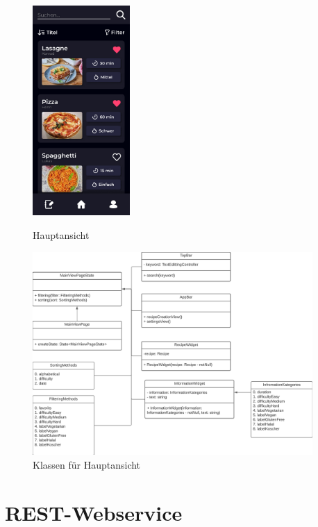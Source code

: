 \documentclass[parskip=full]{scrartcl}
\begin{document}
\begin{figure}[htp]
    \begin{minipage}
        [t]{0.49\textwidth}
        \centering
        \includegraphics[height=80mm]{images/Presentation-layer/MainView.jpg}
        \caption{Hauptansicht}
    \end{minipage}
    \begin{minipage}
        [t]{0.49\textwidth}
        \centering
        \includegraphics[width=0.95\textwidth]{images/Presentation-layer/MainViewClass.png}
        \caption{Klassen für Hauptansicht}
    \end{minipage}
\end{figure}

\newpage

\section{REST-Webservice}
\end{document}
